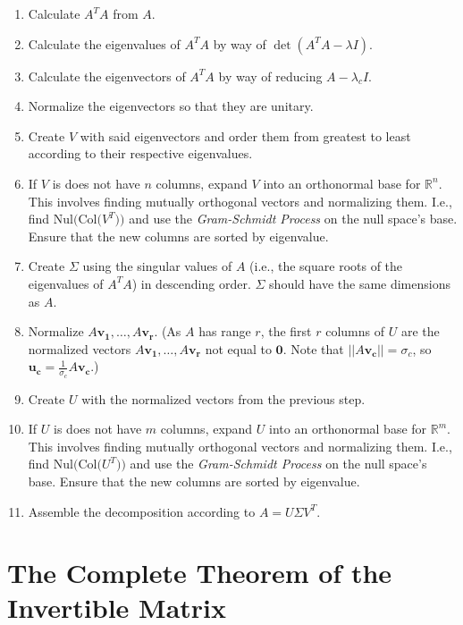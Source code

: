 \documentclass[12pt]{article}
\newcommand{\R}{\mathbb{R}}
\newcommand{\bm}[1]{\mathbf{{#1}}}
\newcommand{\norm}[1]{||{#1}||}
\begin{document}
\begin{enumerate}
    \item Calculate $A^TA$ from $A$.
    \item Calculate the eigenvalues of $A^TA$ by way of $\det (A^TA - \lambda I)$.
    \item Calculate the eigenvectors of $A^TA$ by way of reducing $A - \lambda_c I$.
    \item Normalize the eigenvectors so that they are unitary.
    \item Create $V$ with said eigenvectors and order them from greatest to least according to their respective eigenvalues.
    \item If $V$ is does not have $n$ columns, expand $V$ into an orthonormal base for $\R^n$. This involves finding mutually orthogonal vectors and normalizing them. I.e., find $\textrm{Nul(Col($V^T$))}$ and use the \emph{Gram-Schmidt Process} on the null space's base. Ensure that the new columns are sorted by eigenvalue.
    \item Create $\Sigma$ using the singular values of $A$ (i.e., the square roots of the eigenvalues of $A^TA$) in descending order. $\Sigma$ should have the same dimensions as $A$.
    \item Normalize $A\bm{v_1},\dots,A\bm{v_r}$. (As $A$ has range $r$, the first $r$ columns of $U$ are the normalized vectors $A\bm{v_1},\dots,A\bm{v_r}$ not equal to $\bm{0}$. Note that $\norm{A\bm{v_c}} = \sigma_c$, so $\bm{u_c} = \frac{1}{\sigma_c}A\bm{v_c}$.)
    \item Create $U$ with the normalized vectors from the previous step.
    \item If $U$ is does not have $m$ columns, expand $U$ into an orthonormal base for $\R^m$. This involves finding mutually orthogonal vectors and normalizing them. I.e., find $\textrm{Nul(Col($U^T$))}$ and use the \emph{Gram-Schmidt Process} on the null space's base. Ensure that the new columns are sorted by eigenvalue.
    \item Assemble the decomposition according to $A = U\Sigma V^T$.
\end{enumerate}

\section*{The Complete Theorem of the Invertible Matrix}
\end{document}
